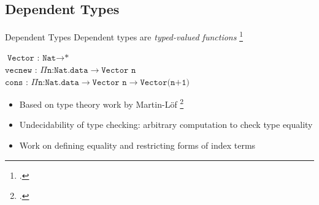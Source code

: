 \documentclass[aspectratio=169]{beamer}
\begin{document}


\subsection{Dependent Types}

\begin{frame}{Dependent Types}
    Dependent types are \emph{typed-valued functions} \footcite{pierce_advanced_2005}
\pause
\begin{center}
   $\texttt{Vector : Nat}\rightarrow\texttt{*}$
   \pause
   \\
   $\texttt{vecnew : }\Pi\texttt{n:Nat.data}\rightarrow\texttt{Vector n}$
   \\
    \pause
   $\texttt{cons : }\Pi\texttt{n:Nat.data}\rightarrow\texttt{Vector n}\rightarrow\texttt{Vector(n+1)}$
\end{center}
    \pause
    \begin{itemize}
        \item Based on type theory work by Martin-L{\"o}f \footcite{martin-lof_constructive_1984}
        \item Undecidability of type checking: arbitrary computation to check type equality
        \item Work on defining equality and restricting forms of index terms
    \end{itemize}
\end{frame}
\end{document}
